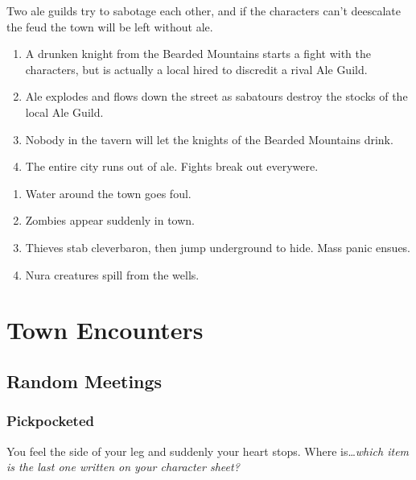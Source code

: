 Two ale guilds try to sabotage each other, and if the characters can't deescalate the feud the town will be left without ale.

\begin{enumerate}

	\item{A drunken knight from the Bearded Mountains starts a fight with the characters, but is actually a local hired to discredit a rival Ale Guild.}
	\item{Ale explodes and flows down the street as sabatours destroy the stocks of the local Ale Guild.}
	\item{Nobody in the tavern will let the knights of the Bearded Mountains drink.}
	\item{ The entire city runs out of ale.  Fights break out everywere.}

\end{enumerate}


\begin{enumerate}

	\item{ Water around the town goes foul.}
	\item{ Zombies appear suddenly in town.}
	\item{ Thieves stab \gls{cleverbaron}, then jump underground to hide.  Mass panic ensues.}
	\item{  Nura creatures spill from the wells.}

\end{enumerate}

\humanthief

\section{Town Encounters}
\setcounter{encnum}{1}

\subsection{Random Meetings}\label{randommeetings}

\subsubsection{Pickpocketed}

\begin{boxtext}
	You feel the side of your leg and suddenly your heart stops.  Where is\ldots \textit{which item is the last one written on your character sheet?}
\end{boxtext}

